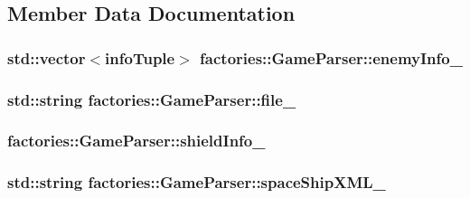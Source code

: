 \subsection{\-Member \-Data \-Documentation}
\hypertarget{classfactories_1_1GameParser_a4f47365bc9e1c11e696aca260371f56e}{
\subsubsection[{enemy\-Info\-\_\-}]{\setlength{\rightskip}{0pt plus 5cm}std\-::vector$<${\bf info\-Tuple}$>$ {\bf factories\-::\-Game\-Parser\-::enemy\-Info\-\_\-}}}\label{d0/dc6/classfactories_1_1GameParser_a4f47365bc9e1c11e696aca260371f56e}
\hypertarget{classfactories_1_1GameParser_a9db6aca324777c1e49ac03bc46ca982b}{
\subsubsection[{file\-\_\-}]{\setlength{\rightskip}{0pt plus 5cm}std\-::string {\bf factories\-::\-Game\-Parser\-::file\-\_\-}}}\label{d0/dc6/classfactories_1_1GameParser_a9db6aca324777c1e49ac03bc46ca982b}
\hypertarget{classfactories_1_1GameParser_a06cf40ec918bb6a1b279501a8006c79b}{
\subsubsection[{shield\-Info\-\_\-}]{ {\bf factories\-::\-Game\-Parser\-::shield\-Info\-\_\-}}}\label{d0/dc6/classfactories_1_1GameParser_a06cf40ec918bb6a1b279501a8006c79b}
\hypertarget{classfactories_1_1GameParser_a67d451e1bbc18bde57e2d23de432a53d}{
\subsubsection[{space\-Ship\-X\-M\-L\-\_\-}]{\setlength{\rightskip}{0pt plus 5cm}std\-::string {\bf factories\-::\-Game\-Parser\-::space\-Ship\-X\-M\-L\-\_\-}}}\label{d0/dc6/classfactories_1_1GameParser_a67d451e1bbc18bde57e2d23de432a53d}
